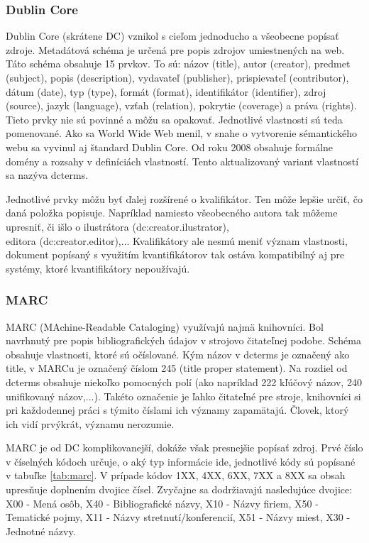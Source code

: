 \documentclass[thesis=M,slovak]{FITthesis}[2013/05/06]
\begin{document}
\subsubsection{Dublin Core}
Dublin Core (skrátene DC) vznikol s cieľom jednoducho a všeobecne popísať zdroje. Metadátová schéma je určená pre popis zdrojov umiestnených na web. Táto schéma obsahuje 15 prvkov. To sú: názov (title), autor (creator), predmet (subject), popis (description), vydavateľ (publisher), prispievateľ (contributor), dátum (date), typ (type), formát (format), identifikátor (identifier), zdroj (source), jazyk (language), vzťah (relation), pokrytie (coverage) a práva (rights). \cite[s.~37]{zhang2014creating} Tieto prvky nie sú povinné a môžu sa opakovať. Jednotlivé vlastnosti sú teda pomenované. Ako sa World Wide Web menil, v snahe o vytvorenie sémantického webu sa vyvinul aj štandard Dublin Core. Od roku 2008 obsahuje formálne domény a rozsahy v definíciách vlastností. Tento aktualizovaný variant vlastností sa nazýva dcterms. 

Jednotlivé prvky môžu byť ďalej rozšírené o kvalifikátor. Ten môže lepšie určiť, čo daná položka popisuje. Napríklad namiesto všeobecného autora tak môžeme upresniť, či išlo o ilustrátora (dc:creator.ilustrator), \\editora (dc:creator.editor),... Kvalifikátory ale nesmú meniť význam vlastnosti, dokument popísaný s využitím kvantifikátorov tak ostáva kompatibilný aj pre systémy, ktoré kvantifikátory nepoužívajú.\cite[s.~295]{witten2009build}

\subsubsection{MARC}
MARC (MAchine-Readable Cataloging) využívajú najmä knihovníci. Bol navrhnutý pre popis bibliografických údajov v strojovo čitateľnej podobe.
Schéma obsahuje vlastnosti, ktoré sú očíslované. Kým názov v dcterms je označený ako title, v MARCu  je označený číslom 245 (title proper statement). Na rozdiel od dcterms obsahuje niekoľko pomocných polí (ako napríklad 222 kľúčový názov, 240 unifikovaný názov,...).\cite[s.~288-289]{witten2009build} Takéto označenie je ľahko čitateľné pre stroje, knihovníci si pri každodennej práci s týmito číslami ich významy zapamätajú. Človek, ktorý ich vidí prvýkrát, významu nerozumie.

MARC je od DC komplikovanejší, dokáže však presnejšie popísať zdroj.
Prvé číslo v číselných kódoch určuje, o aký typ informácie ide, jednotlivé kódy sú popísané v tabuľke \ref{tab:marc}. V prípade kódov 1XX, 4XX, 6XX, 7XX a 8XX sa obsah upresňuje doplnením dvojice čísel. Zvyčajne sa dodržiavajú nasledujúce dvojice: X00 - Mená osôb, X40 - Bibliografické názvy, X10 - Názvy firiem, X50 - Tematické pojmy, X11 - Názvy stretnutí/konferencií, X51 - Názvy miest, X30 - Jednotné názvy.
\end{document}
